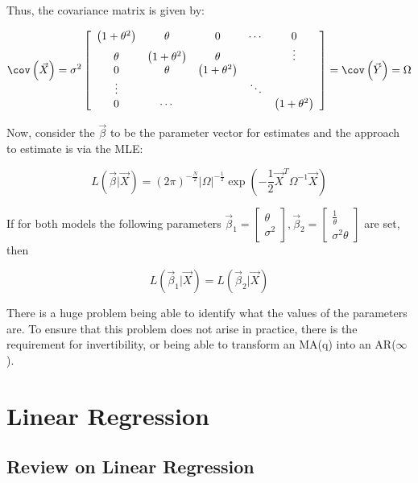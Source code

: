 \documentclass[]{book}
\theoremstyle{definition}
\theoremstyle{definition}
\theoremstyle{definition}
\theoremstyle{remark}
\begin{document}
{Thus, the covariance matrix is given by:

\[\cov \left( {\vec X} \right) = {\sigma ^2}\left[ {\begin{array}{*{20}{c}}
  {\left( {1 + {\theta ^2}} \right)}&\theta &0& \cdots &0 \\ 
  \theta &{\left( {1 + {\theta ^2}} \right)}&\theta &{}& \vdots  \\ 
  0&\theta &{\left( {1 + {\theta ^2}} \right)}&{}&{} \\ 
   \vdots &{}&{}& \ddots &{} \\ 
  0& \cdots &{}&{}&{\left( {1 + {\theta ^2}} \right)} 
\end{array}} \right] = \cov \left( {\vec Y} \right) = \Omega \]

Now, consider the \(\vec \beta\) to be the parameter vector for
estimates and the approach to estimate is via the MLE:

\[L\left( {\vec \beta |\vec X} \right) = {\left( {2\pi } \right)^{ - \frac{N}{2}}}{\left| \Omega  \right|^{ - \frac{1}{2}}}\exp \left( { - \frac{1}{2}{{\vec X}^T}{\Omega ^{ - 1}}\vec X} \right)\]

If for both models the following parameters
\({{\vec \beta }_1} = \left[ {\begin{array}{*{20}{c}}  \theta \\  {{\sigma ^2}} \end{array}} \right],{{\vec \beta }_2} = \left[ {\begin{array}{*{20}{c}}  {\frac{1}{\theta }} \\  {{\sigma ^2}\theta } \end{array}} \right]\)
are set, then

\[L\left( {{{\vec \beta }_1}|\vec X} \right) = L\left( {{{\vec \beta }_2}|\vec X} \right)\]

There is a huge problem being able to identify what the values of the
parameters are. To ensure that this problem does not arise in practice,
there is the requirement for invertibility, or being able to transform
an MA(q) into an AR(\(\infty\)).

\hypertarget{linear-regression}{%
\chapter{Linear Regression}\label{linear-regression}}

\hypertarget{review-on-linear-regression}{%
\section{Review on Linear
Regression}\label{review-on-linear-regression}}

}
\end{document}
